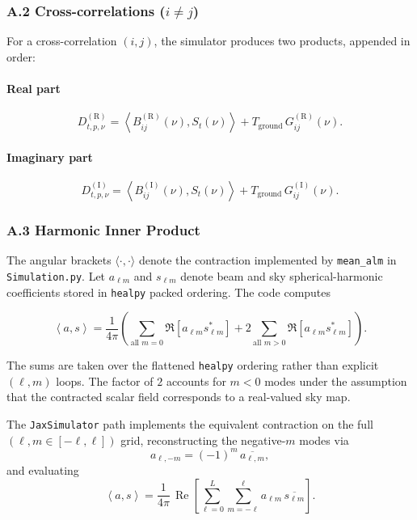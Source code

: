 \documentclass[11pt]{article}
\newcommand{\RePart}{\operatorname{Re}}
\begin{document}
\subsubsection*{A.2 Cross-correlations ($i\neq j$)}

For a cross-correlation $(i,j)$, the simulator produces two products, appended in order:

\paragraph{Real part}
\[
D^{(\mathrm{R})}_{t,p,\nu}
=
\left\langle B^{(\mathrm{R})}_{ij}(\nu), S_t(\nu) \right\rangle
+
T_{\mathrm{ground}}\,G^{(\mathrm{R})}_{ij}(\nu).
\]

\paragraph{Imaginary part}
\[
D^{(\mathrm{I})}_{t,p,\nu}
=
\left\langle B^{(\mathrm{I})}_{ij}(\nu), S_t(\nu) \right\rangle
+
T_{\mathrm{ground}}\,G^{(\mathrm{I})}_{ij}(\nu).
\]

\subsubsection*{A.3 Harmonic Inner Product}

The angular brackets $\langle \cdot,\cdot \rangle$ denote the contraction implemented by \texttt{mean\_alm} in \texttt{Simulation.py}. Let $a_{\ell m}$ and $s_{\ell m}$ denote beam and sky spherical-harmonic coefficients stored in \texttt{healpy} packed ordering. The code computes

\[
\left\langle a, s \right\rangle
=
\frac{1}{4\pi}
\left(
\sum_{\text{all } m=0} \Re\!\left[a_{\ell m}s_{\ell m}^*\right]
+
2\sum_{\text{all } m>0} \Re\!\left[a_{\ell m}s_{\ell m}^*\right]
\right).
\]

The sums are taken over the flattened \texttt{healpy} ordering rather than explicit $(\ell,m)$ loops. The factor of $2$ accounts for $m<0$ modes under the assumption that the contracted scalar field corresponds to a real-valued sky map.

The \texttt{JaxSimulator} path implements the equivalent contraction on the full $(\ell, m\in[-\ell,\ell])$ grid, reconstructing the negative-$m$ modes via
\[
a_{\ell,-m} = (-1)^m\,\overline{a_{\ell,m}},
\]
and evaluating
\[
\left\langle a, s \right\rangle
=
\frac{1}{4\pi}\,\RePart\!\left[\sum_{\ell=0}^{L}\sum_{m=-\ell}^{\ell} a_{\ell m}\,\overline{s_{\ell m}}\right].
\]
\end{document}
